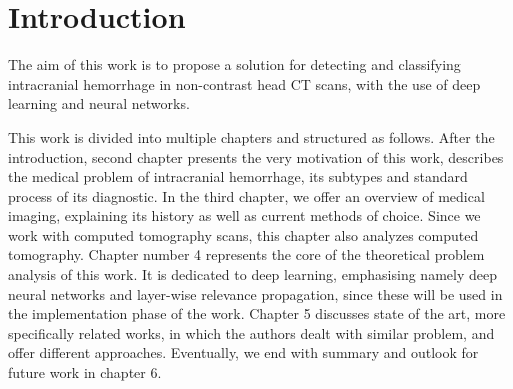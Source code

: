 \chapter{Introduction}

The aim of this work is to propose a solution for detecting and classifying intracranial hemorrhage in non-contrast head CT scans, with the use of deep learning and neural networks. 

This work is divided into multiple chapters and structured as follows. After the introduction, second chapter presents the very motivation of this work, describes the medical problem of intracranial hemorrhage, its subtypes and standard process of its diagnostic. In the third chapter, we offer an overview of medical imaging, explaining its history as well as current methods of choice. Since we work with computed tomography scans, this chapter also analyzes computed tomography. Chapter number 4 represents the core of the theoretical problem analysis of this work. It is dedicated to deep learning, emphasising namely deep neural networks and layer-wise relevance propagation, since these will be used in the implementation phase of the work. Chapter 5 discusses state of the art, more specifically related works, in which the authors dealt with similar problem, and offer different approaches. Eventually, we end with summary and outlook for future work in chapter 6.

